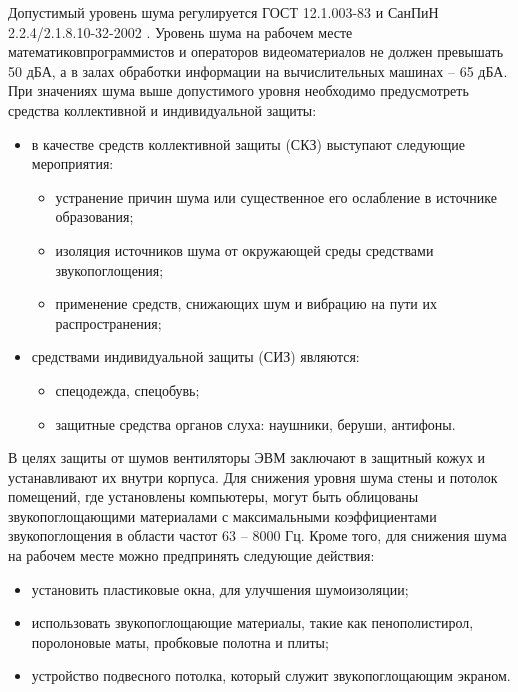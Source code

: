 Допустимый уровень шума регулируется ГОСТ 12.1.003-83 \cite{Gost2002} и СанПиН 2.2.4/2.1.8.10-32-2002 \cite{SanPin2002}. 
Уровень шума на рабочем месте математиков\-программистов и операторов видеоматериалов не должен превышать 50 дБА, а в залах обработки информации на вычислительных машинах -- 65 дБА.
При значениях шума выше допустимого уровня необходимо предусмотреть средства коллективной и индивидуальной защиты:
\begin{itemize}
    \item в качестве средств коллективной защиты (СКЗ) выступают следующие мероприятия:
    \begin{itemize}[leftmargin=+]
        \item устранение причин шума или существенное его ослабление в источнике образования;
        \item изоляция источников шума от окружающей среды средствами звукопоглощения;
        \item применение средств, снижающих шум и вибрацию на пути их распространения;
    \end{itemize}
    \item средствами индивидуальной защиты (СИЗ) являются:
    \begin{itemize}[leftmargin=+]
        \item спецодежда, спецобувь;
        \item защитные средства органов слуха: наушники, беруши, антифоны.
    \end{itemize}
\end{itemize}

В целях защиты от шумов вентиляторы ЭВМ заключают в защитный кожух и устанавливают их внутри корпуса. 
Для снижения уровня шума стены и потолок помещений, где установлены компьютеры, могут быть облицованы звукопоглощающими материалами с максимальными коэффициентами звукопоглощения в области частот 63 -- 8000 Гц.
Кроме того, для снижения шума на рабочем месте можно предпринять следующие действия:
\begin{itemize}
    \item установить пластиковые окна, для улучшения шумоизоляции;
    \item использовать звукопоглощающие материалы, такие как пенополистирол, поролоновые маты, пробковые полотна и плиты;
    \item устройство подвесного потолка, который служит звукопоглощающим экраном.
\end{itemize}


